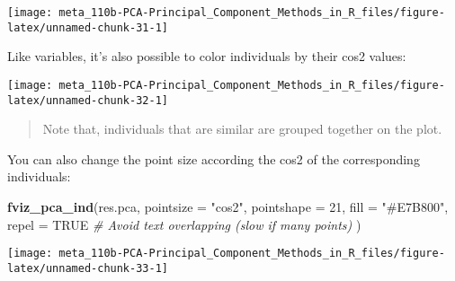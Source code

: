 \documentclass[]{book}
\newenvironment{Shaded}{\begin{snugshade}}{\end{snugshade}}
\newcommand{\CommentTok}[1]{\textcolor[rgb]{0.56,0.35,0.01}{\textit{#1}}}
\newcommand{\DataTypeTok}[1]{\textcolor[rgb]{0.13,0.29,0.53}{#1}}
\newcommand{\DecValTok}[1]{\textcolor[rgb]{0.00,0.00,0.81}{#1}}
\newcommand{\KeywordTok}[1]{\textcolor[rgb]{0.13,0.29,0.53}{\textbf{#1}}}
\newcommand{\NormalTok}[1]{#1}
\newcommand{\OtherTok}[1]{\textcolor[rgb]{0.56,0.35,0.01}{#1}}
\newcommand{\StringTok}[1]{\textcolor[rgb]{0.31,0.60,0.02}{#1}}
\begin{document}
\begin{center}\texttt{[image: meta\_110b-PCA-Principal\_Component\_Methods\_in\_R\_files/figure-latex/unnamed-chunk-31-1]} \end{center}

Like variables, it's also possible to color individuals by their cos2 values:

\begin{Shaded}
\end{Shaded}

\begin{center}\texttt{[image: meta\_110b-PCA-Principal\_Component\_Methods\_in\_R\_files/figure-latex/unnamed-chunk-32-1]} \end{center}

\begin{quote}
Note that, individuals that are similar are grouped together on the plot.
\end{quote}

You can also change the point size according the cos2 of the corresponding individuals:

\begin{Shaded}
\begin{Highlighting}[]
\KeywordTok{fviz_pca_ind}\NormalTok{(res.pca, }\DataTypeTok{pointsize =} \StringTok{"cos2"}\NormalTok{, }
             \DataTypeTok{pointshape =} \DecValTok{21}\NormalTok{, }\DataTypeTok{fill =} \StringTok{"#E7B800"}\NormalTok{,}
             \DataTypeTok{repel =} \OtherTok{TRUE} \CommentTok{# Avoid text overlapping (slow if many points)}
\NormalTok{             )}
\end{Highlighting}
\end{Shaded}

\begin{center}\texttt{[image: meta\_110b-PCA-Principal\_Component\_Methods\_in\_R\_files/figure-latex/unnamed-chunk-33-1]} \end{center}
\end{document}
